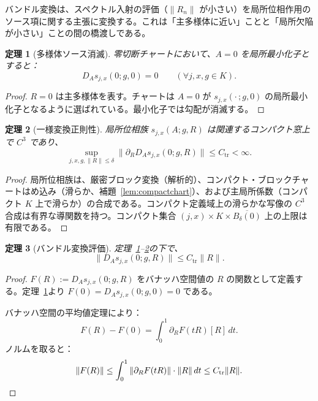 \documentclass[12pt]{article}
\theoremstyle{plain}
\newtheorem{theorem}{定理}[section]
\theoremstyle{definition}
\numberwithin{equation}{section}
\newcommand{\tr}{\mathrm{tr}}
\begin{document}
バンドル変換は、スペクトル入射の評価（$\|R_n\|$ が小さい）を局所位相作用のソース項に関する主張に変換する。これは「主多様体に近い」ことと「局所欠陥が小さい」ことの間の橋渡しである。

\begin{theorem}[多様体ソース消滅]\label{thm:sourcevanishing}
零切断チャートにおいて、$A=0$ を局所最小化子とすると：
\begin{equation}
D_A s_{j,x}(0;g,0) = 0\qquad(\forall j,x,g\in K).
\end{equation}
\end{theorem}

\begin{proof}
$R=0$ は主多様体を表す。チャートは $A=0$ が $s_{j,x}(\cdot\,;g,0)$ の局所最小化子となるように選ばれている。最小化子では勾配が消滅する。
\end{proof}

\begin{theorem}[一様変換正則性]\label{thm:regularity}
局所位相族 $s_{j,x}(A;g,R)$ は関連するコンパクト窓上で $C^3$ であり、
\begin{equation}
\sup_{j,x,g,\|R\|\leq\delta}\|\partial_{R}D_A s_{j,x}(0;g,R)\| \leq C_{\tr} < \infty.
\end{equation}
\end{theorem}

\begin{proof}
局所位相族は、厳密ブロック変換（解析的）、コンパクト・ブロックチャートはめ込み（滑らか、補題~\ref{lem:compactchart}）、および主局所係数（コンパクト $K$ 上で滑らか）の合成である。コンパクト定義域上の滑らかな写像の $C^3$ 合成は有界な導関数を持つ。コンパクト集合 $(j,x)\times K\times\overline{B_\delta(0)}$ 上の上限は有限である。
\end{proof}

\begin{theorem}[バンドル変換評価]\label{thm:transduction}
定理~\ref{thm:sourcevanishing}--\ref{thm:regularity}の下で、
\begin{equation}
\boxed{\|D_A s_{j,x}(0;g,R)\| \leq C_{\tr}\|R\|.}
\end{equation}
\end{theorem}

\begin{proof}
$F(R):=D_A s_{j,x}(0;g,R)$ をバナッハ空間値の $R$ の関数として定義する。定理~\ref{thm:sourcevanishing}より $F(0)=D_A s_{j,x}(0;g,0)=0$ である。

バナッハ空間の平均値定理により：
\begin{equation}
F(R)-F(0) = \int_0^1\partial_{R}F(tR)[R]\,dt.
\end{equation}
ノルムを取ると：
\begin{equation}
\|F(R)\| \leq \int_0^1\|\partial_{R}F(tR)\|\cdot\|R\|\,dt \leq C_{\tr}\|R\|.\qedhere
\end{equation}
\end{proof}
\end{document}
